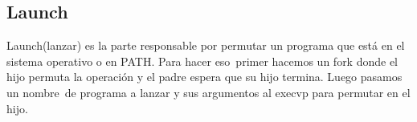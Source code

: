 \newpage
\subsection{Launch}
Launch(lanzar) es la parte responsable por permutar un programa que está en el sistema operativo o en PATH. Para hacer eso\
primer hacemos un fork donde el hijo permuta la operación y el padre espera que su hijo termina. Luego pasamos un nombre\
de programa a lanzar y sus argumentos al execvp para permutar en el hijo.
